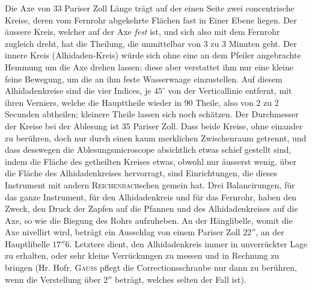 Die Axe von 33 Pariser Zoll Länge trägt auf der einen Seite zwei concentrische Kreise, deren vom
Fernrohr abgekehrte Flächen fast in Einer Ebene liegen. Der äussere Kreis, welcher auf der Axe
\textit{fest} ist, und sich also mit dem Fernrohr zugleich dreht, hat die Theilung, die unmittelbar
von 3 zu 3 
Minuten geht. Der innere Kreis (Alhidaden-Kreis) würde sich ohne eine an dem Pfeiler angebrachte
Hemmung um die Axe drehen lassen: diese aber verstattet ihm nur eine kleine feine Bewegung, um die
an ihm feste Wasserwaage einzustellen. Auf diesem Alhidadenkreise sind die vier Indices, je
$45^\circ$ von der Verticallinie entfernt, mit ihren Verniers, welche die Haupttheile wieder in 90
Theile, also von 2 zu 2 Secunden abtheilen; kleinere Theile lassen sich noch schätzen. Der
Durchmesser der Kreise bei der Ablesung ist 35 Pariser Zoll. Dass beide Kreise, ohne einander zu
berühren, doch nur durch einen kaum merklichen Zwischenraum getrennt, und dass desswegen die
Ablesungsmicroscope absichtlich etwas schief gestellt sind, indem die Fläche des getheilten Kreises
etwas, obwohl nur äusserst wenig, über die Fläche des Alhidadenkreises hervorragt, sind
Einrichtungen, die dieses Instrument mit andern \textsc{Reichenbach}schen gemein hat. Drei
Balancirungen, für das ganze Instrument, für den Alhidadenkreis und für das Fernrohr, haben den
Zweck, den Druck der Zapfen auf die Pfannen und des Alhidadenkreises auf die Axe, so wie die
Biegung des Rohrs aufzuheben. An der Hänglibelle, womit die Axe nivellirt wird, beträgt ein
Ausschlag von einem Pariser Zoll $22''$, an der Hauptlibelle $17''6$. Letztere dient, den
Alhidadenkreis immer in unverrückter Lage zu erhalten, oder sehr kleine Verrückungen zu messen und
in Rechnung zu bringen (Hr. Hofr. \textsc{Gauss} pflegt die Correctionsschraube nur dann zu
berühren, wenn die Verstellung über $2''$ beträgt, welches selten der Fall ist).

